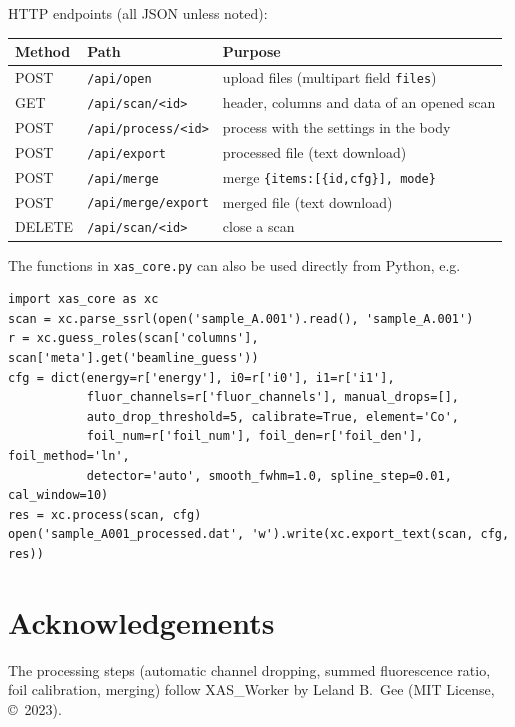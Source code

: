 \documentclass[11pt,a4paper]{article}
\newcommand{\file}[1]{\texttt{#1}}
\begin{document}
HTTP endpoints (all JSON unless noted):
\begin{center}
\begin{tabular}{@{}lll@{}}
\toprule
Method & Path & Purpose\\
\midrule
POST   & \texttt{/api/open}           & upload files (multipart field \texttt{files})\\
GET    & \texttt{/api/scan/<id>}      & header, columns and data of an opened scan\\
POST   & \texttt{/api/process/<id>}   & process with the settings in the body\\
POST   & \texttt{/api/export}         & processed file (text download)\\
POST   & \texttt{/api/merge}          & merge \texttt{\{items:[\{id,cfg\}], mode\}}\\
POST   & \texttt{/api/merge/export}   & merged file (text download)\\
DELETE & \texttt{/api/scan/<id>}      & close a scan\\
\bottomrule
\end{tabular}
\end{center}

The functions in \file{xas\_core.py} can also be used directly from Python, e.g.
\begin{shell}
\begin{Verbatim}[fontsize=\small]
import xas_core as xc
scan = xc.parse_ssrl(open('sample_A.001').read(), 'sample_A.001')
r = xc.guess_roles(scan['columns'], scan['meta'].get('beamline_guess'))
cfg = dict(energy=r['energy'], i0=r['i0'], i1=r['i1'],
           fluor_channels=r['fluor_channels'], manual_drops=[],
           auto_drop_threshold=5, calibrate=True, element='Co',
           foil_num=r['foil_num'], foil_den=r['foil_den'], foil_method='ln',
           detector='auto', smooth_fwhm=1.0, spline_step=0.01, cal_window=10)
res = xc.process(scan, cfg)
open('sample_A001_processed.dat', 'w').write(xc.export_text(scan, cfg, res))
\end{Verbatim}
\end{shell}

\section*{Acknowledgements}
The processing steps (automatic channel dropping, summed fluorescence ratio, foil
calibration, merging) follow XAS\_Worker by Leland B.\ Gee (MIT License, \copyright\ 2023).
\end{document}
